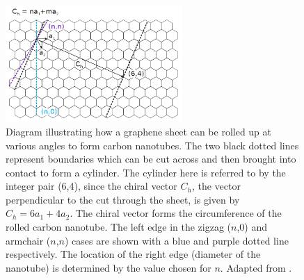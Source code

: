 \documentclass[
  a4paper,
]{scrbook}
\begin{document}
\begin{figure}

{\centering \includegraphics[width=0.6\textwidth,height=\textheight]{figures/ch2/carbon_nanotube_wrapping.png}

}

\caption[Diagram illustrating how a graphene sheet can be rolled up at
various angles to form carbon
nanotubes.]{\label{fig-carbon-nanotube-wrapping}Diagram illustrating how
a graphene sheet can be rolled up at various angles to form carbon
nanotubes. The two black dotted lines represent boundaries which can be
cut across and then brought into contact to form a cylinder. The
cylinder here is referred to by the integer pair (6,4), since the chiral
vector \(C_h\), the vector perpendicular to the cut through the sheet,
is given by \(C_h = 6a_1+4a_2\). The chiral vector forms the
circumference of the rolled carbon nanotube. The left edge in the zigzag
(\(n\),0) and armchair (\(n\),\(n\)) cases are shown with a blue and
purple dotted line respectively. The location of the right edge
(diameter of the nanotube) is determined by the value chosen for \(n\).
Adapted from \autocite{Dekker1999,Lu2012}.}

\end{figure}
\end{document}
